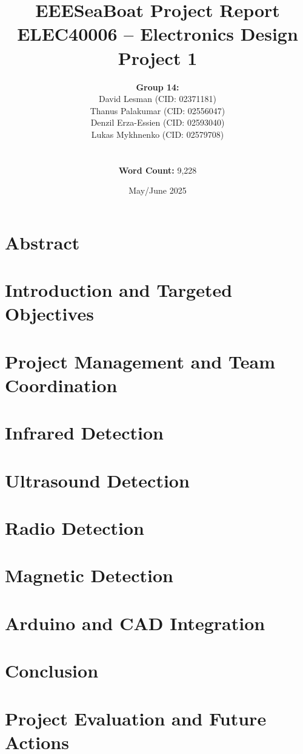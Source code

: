 \documentclass[12pt,a4paper]{report}
\title{\textbf{EEESeaBoat Project Report} \\ \large ELEC40006 -- Electronics Design Project 1}
\author{
\textbf{Group 14:} \\ David Lesman (CID: 02371181) \\ Thanus Palakumar (CID: 02556047) \\ Denzil Erza-Essien (CID: 02593040) \\ Lukas Mykhnenko (CID: 02579708) \\ \\ \\
\textbf{Word Count:} 9,228
}
\date{May/June 2025}
\begin{document}
\maketitle
\tableofcontents
\newpage

\chapter{Abstract}


\chapter{Introduction and Targeted Objectives}

\chapter{Project Management and Team Coordination}


\chapter{Infrared Detection}


\chapter{Ultrasound Detection}


\chapter{Radio Detection}


\chapter{Magnetic Detection}


\chapter{Arduino and CAD Integration}


\chapter{Conclusion}


\chapter{Project Evaluation and Future Actions}

\end{document}
